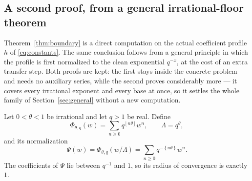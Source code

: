 \documentclass[11pt,letterpaper]{article}
\numberwithin{equation}{section}
\theoremstyle{definition}
\theoremstyle{remark}
\newcommand{\fracpart}[1]{\left\{#1\right\}}
\newcommand{\floor}[1]{\left\lfloor#1\right\rfloor}
\begin{document}
\subsection{A second proof, from a general irrational-floor theorem}
\label{sec:floorboundary}
Theorem~\ref{thm:boundary} is a direct computation on the actual coefficient
profile $h$ of \eqref{eq:constants}. The same conclusion follows from a
general principle in which the profile is first normalized to the clean
exponential $q^{-x}$, at the cost of an extra transfer step. Both proofs are
kept: the first stays inside the concrete problem and needs no auxiliary
series, while the second proves considerably more --- it covers every
irrational exponent and every base at once, so it settles the whole family
of Section~\ref{sec:general} without a new computation.

Let $0<\theta<1$ be irrational and let $q>1$ be real. Define
\begin{equation}\label{eq:Phidef}
 \Phi_{\theta,q}(w)=\sum_{n\ge0}q^{\floor{n\theta}}w^n,
 \qquad \Lambda=q^\theta,
\end{equation}
and its normalization
\begin{equation}\label{eq:Psidef}
 \Psi(w)=\Phi_{\theta,q}(w/\Lambda)=\sum_{n\ge0}q^{-\fracpart{n\theta}}w^n .
\end{equation}
The coefficients of $\Psi$ lie between $q^{-1}$ and $1$, so its radius of
convergence is exactly $1$.
\end{document}
